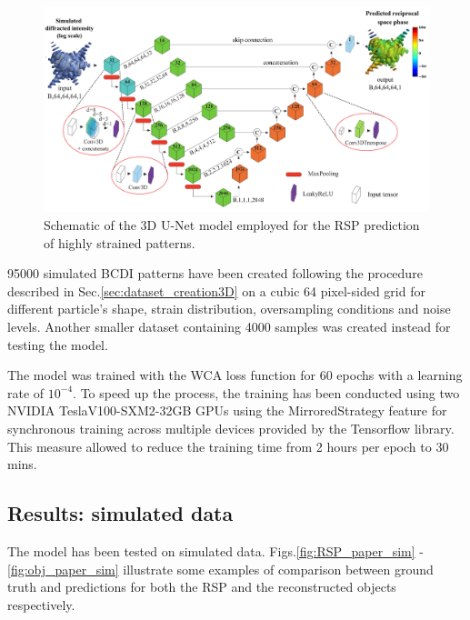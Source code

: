 \begin{figure}[H]
    \centering
    \includegraphics[width=\textwidth]{figures/Phasing/Architecture-1.pdf}
    \caption{Schematic of the 3D U-Net model employed for the RSP prediction of highly strained patterns.}
    \label{fig:architecture_phasing}
\end{figure}

95000 simulated BCDI patterns have been created following the procedure described in Sec.\ref{sec:dataset_creation3D} 
on a cubic 64 pixel-sided grid for different particle's shape, strain distribution, oversampling conditions and noise levels. 
Another smaller dataset containing 4000 samples was created instead for testing the model. 

The model was trained with the WCA loss function for 60 epochs with a learning rate of $10^{-4}$. To speed up the process, 
the training has been conducted using two NVIDIA TeslaV100-SXM2-32GB GPUs using the MirroredStrategy feature for
synchronous training across multiple devices provided by the Tensorflow library. This measure allowed to reduce the training 
time from 2 hours per epoch to 30 mins. 

\subsection{Results: simulated data}\label{chp:phasing_results}

The model has been tested on simulated data. Figs.\ref{fig:RSP_paper_sim} - \ref{fig:obj_paper_sim}
illustrate some examples of comparison between ground truth and predictions for both the RSP and the reconstructed objects 
respectively. 


